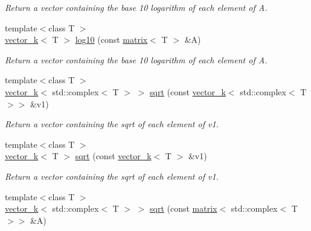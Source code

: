 \begin{DoxyCompactItemize}
\begin{DoxyCompactList}\small\item\em Return a vector containing the base 10 logarithm of each element of A. \end{DoxyCompactList}\item 
\hypertarget{namespacekeycpp_a89b9e24c6952c5216ed82d09e5683118}{{\footnotesize template$<$class T $>$ }\\\hyperlink{classkeycpp_1_1vector__k}{vector\-\_\-k}$<$ T $>$ \hyperlink{namespacekeycpp_a89b9e24c6952c5216ed82d09e5683118}{log10} (const \hyperlink{classkeycpp_1_1matrix}{matrix}$<$ T $>$ \&A)}\label{namespacekeycpp_a89b9e24c6952c5216ed82d09e5683118}

\begin{DoxyCompactList}\small\item\em Return a vector containing the base 10 logarithm of each element of A. \end{DoxyCompactList}\item 
\hypertarget{namespacekeycpp_aa4b7e86c9291f2ca9c5aacdb8e08f9ff}{{\footnotesize template$<$class T $>$ }\\\hyperlink{classkeycpp_1_1vector__k}{vector\-\_\-k}$<$ std\-::complex$<$ T $>$ $>$ \hyperlink{namespacekeycpp_aa4b7e86c9291f2ca9c5aacdb8e08f9ff}{sqrt} (const \hyperlink{classkeycpp_1_1vector__k}{vector\-\_\-k}$<$ std\-::complex$<$ T $>$$>$ \&v1)}\label{namespacekeycpp_aa4b7e86c9291f2ca9c5aacdb8e08f9ff}

\begin{DoxyCompactList}\small\item\em Return a vector containing the sqrt of each element of v1. \end{DoxyCompactList}\item 
\hypertarget{namespacekeycpp_a38b52fad75e8cf7db8b8d3ee7d1a7412}{{\footnotesize template$<$class T $>$ }\\\hyperlink{classkeycpp_1_1vector__k}{vector\-\_\-k}$<$ T $>$ \hyperlink{namespacekeycpp_a38b52fad75e8cf7db8b8d3ee7d1a7412}{sqrt} (const \hyperlink{classkeycpp_1_1vector__k}{vector\-\_\-k}$<$ T $>$ \&v1)}\label{namespacekeycpp_a38b52fad75e8cf7db8b8d3ee7d1a7412}

\begin{DoxyCompactList}\small\item\em Return a vector containing the sqrt of each element of v1. \end{DoxyCompactList}\item 
\hypertarget{namespacekeycpp_ae5bcff39b329c05d8feded07f03c211e}{{\footnotesize template$<$class T $>$ }\\\hyperlink{classkeycpp_1_1vector__k}{vector\-\_\-k}$<$ std\-::complex$<$ T $>$ $>$ \hyperlink{namespacekeycpp_ae5bcff39b329c05d8feded07f03c211e}{sqrt} (const \hyperlink{classkeycpp_1_1matrix}{matrix}$<$ std\-::complex$<$ T $>$$>$ \&A)}\label{namespacekeycpp_ae5bcff39b329c05d8feded07f03c211e}


\end{DoxyCompactItemize}
